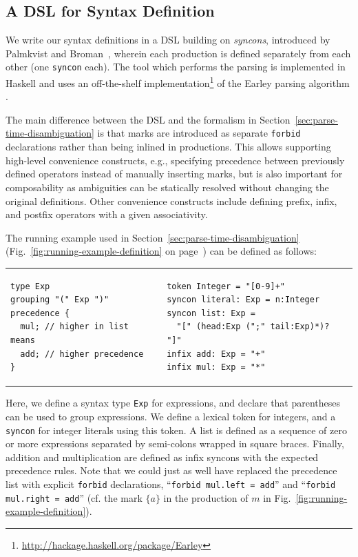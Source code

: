 \documentclass[runningheads]{llncs}
\newcommand{\syncon}{\lstinline[language=syncon]}
\begin{document}
\subsection{A DSL for Syntax Definition}
\label{sec:evaluation-syncon}

We write our syntax definitions in a DSL building on
\emph{syncons}, introduced by Palmkvist and
Broman~\cite{palmkvistCreatingDomainSpecificLanguages2019},
wherein each production is defined separately from each other (one
\syncon{syncon} each).
%
The tool which performs the parsing is implemented in Haskell and
uses an off-the-shelf
implementation\footnote{\url{http://hackage.haskell.org/package/Earley}}
of the Earley parsing algorithm
\cite{earleyEfficientContextfreeParsing1970}.

The main difference between the DSL and the formalism in
Section~\ref{sec:parse-time-disambiguation} is that marks are
introduced as separate \syncon{forbid} declarations rather than
being inlined in productions. This allows supporting high-level
convenience constructs, e.g., specifying precedence between
previously defined operators instead of manually inserting marks,
but is also important for composability as ambiguities can be
statically resolved without changing the original definitions.
Other convenience constructs include defining prefix, infix, and
postfix operators with a given associativity.

The running example used in
Section~\ref{sec:parse-time-disambiguation}
(Fig.~\ref{fig:running-example-definition} on
page~\pageref{fig:running-example-definition}) can be defined as
follows:

\begin{tabular}{ll}
\small
\begin{lstlisting}[language=syncon,boxpos=t]
type Exp
grouping "(" Exp ")"
precedence {
  mul; // higher in list means
  add; // higher precedence
}
\end{lstlisting}
&
\small
\begin{lstlisting}[language=syncon,boxpos=t]
token Integer = "[0-9]+"
syncon literal: Exp = n:Integer
syncon list: Exp =
  "[" (head:Exp (";" tail:Exp)*)? "]"
infix add: Exp = "+"
infix mul: Exp = "*"
\end{lstlisting}
\end{tabular}\smallskip

\noindent Here, we define a syntax type \syncon{Exp} for
expressions, and declare that parentheses can be used to group
expressions. We define a lexical token for integers, and a
\syncon{syncon} for integer literals using this token. A list is
defined as a sequence of zero or more expressions separated by
semi-colons wrapped in square braces. Finally, addition and
multiplication are defined as infix syncons with the expected
precedence rules. Note that we could just as well have replaced
the precedence list with explicit \syncon{forbid} declarations,
``\syncon{forbid mul.left = add}'' and ``\syncon{forbid mul.right = add}''
(cf. the mark $\{a\}$ in the production of $m$ in
Fig.~\ref{fig:running-example-definition}).
\end{document}
